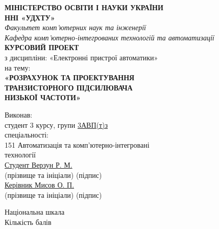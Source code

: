\documentclass[main.tex]{subfiles}
\begin{document}
\thispagestyle{empty}
\begin{center}
    \textbf{МІНІСТЕРСТВО ОСВІТИ І НАУКИ УКРАЇНИ}\\[0.3cm]
    \textbf{ННІ «УДХТУ»}\\[0.5cm]
    
    \textit{Факультет комп'ютерних наук та інженерії}\\
    \textit{Кафедра комп'ютерно-інтегрованих технологій та автоматизації}\\[3cm]
    
    \Large{\textbf{КУРСОВИЙ ПРОЕКТ}}\\[0.5cm]
    \normalsize
    з дисципліни: «Електронні пристрої автоматики»\\[0.5cm]
    на тему:\\[0.3cm]
    \Large{\textbf{«РОЗРАХУНОК ТА ПРОЕКТУВАННЯ}}\\
    \Large{\textbf{ТРАНЗИСТОРНОГО ПІДСИЛЮВАЧА}}\\
    \Large{\textbf{НИЗЬКОЇ ЧАСТОТИ»}}\\[2.5cm]
    
    \begin{minipage}[t]{0.45\textwidth}
        \begin{flushleft}
            \normalsize
            Виконав:\\
            студент 3 курсу, групи \underline{\hspace{2cm}3АВП(т)з}\\
            спеціальності:\\
            151 Автоматизація та комп'ютерно-інтегровані\\
            технології\\[0.5cm]
            \underline{Студент Верзун Р. М.\hspace{2cm}}\\
            \hspace*{1cm}\footnotesize{(прізвище та ініціали)} \hspace*{2cm} \footnotesize{(підпис)}\\[1cm]
            
            \underline{Керівник Мисов О. П.\hspace{2cm}}\\
            \hspace*{1cm}\footnotesize{(прізвище та ініціали)} \hspace*{2cm} \footnotesize{(підпис)}
        \end{flushleft}
    \end{minipage}
    \hfill
    \begin{minipage}[t]{0.45\textwidth}
        \begin{flushright}
            \normalsize
            Національна шкала \underline{\hspace{3cm}}\\[0.5cm]
            Кількість балів \underline{\hspace{2cm}}\\[1.5cm]
            

\end{flushright}
\end{minipage}
\end{center}
\end{document}
